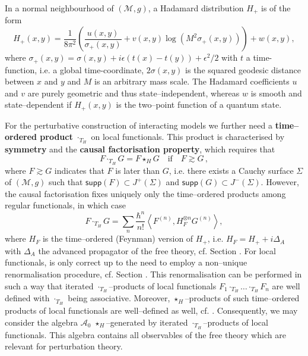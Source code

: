 \documentclass[10pt]{book}
\newcommand{\supp}{\mathsf{supp}}
\newcommand{\Acal}{\mathcal{A}}
\newcommand{\Mcal}{\mathcal{M}}
\theoremstyle{break}
\begin{document}
In a normal neighbourhood of $(\Mcal,g)$, a Hadamard distribution $H_+$ is of the form
\begin{equation}
H_+(x,y)=\frac{1}{8\pi^2}\left(\frac{u(x,y)}{\sigma_+(x,y)}+v(x,y)\log(M^2 \sigma_+(x,y))\right)+w(x,y),
\end{equation}
where $\sigma_+(x,y)=\sigma(x,y)+i\epsilon (t(x)-t(y))+\epsilon^2/2$ with $t$ a time-function, i.e. a global time-coordinate, $2\sigma(x,y)$ is the squared geodesic distance between $x$ and $y$ and $M$ is an arbitrary mass scale. The Hadamard coefficients $u$ and $v$ are purely geometric and thus state--independent, whereas $w$ is smooth and state--dependent if $H_+(x,y)$ is the two--point function of a quantum state.

For the perturbative construction of interacting models we further need a {\bf time--ordered product} $\cdot_{T_H}$ on local functionals. This product is characterised by {\bf symmetry} and the {\bf causal factorisation property}, which requires that 
\begin{equation}
F\cdot_{T_H} G =  F\star_H G\quad    \text{if}\quad F\gtrsim G\,,
\end{equation}
where $F \gtrsim G$ indicates that $F$ is later than $G$, i.e. there exists a Cauchy surface $\Sigma$ of $(\Mcal,g)$ such that $\supp(F) \subset J^+(\Sigma)$ and $\supp(G) \subset J^-(\Sigma)$. However, the causal factorisation fixes uniquely only the time--ordered products among regular functionals, in which case
\begin{equation}
F \cdot_{T_H}  G =  \sum_n \frac{\hbar^n}{n!}\left\langle F^{(n)}, H_F^{\otimes n} G^{(n)} \right\rangle,
\end{equation}
where $H_F$ is the time--ordered (Feynman) version of $H_+$, i.e. $H_F=H_++i\Delta_A$ with $\Delta_A$ the advanced propagator of the free theory, cf. Section %
. For local functionals, %
is only correct up to the need to employ a non--unique renormalisation procedure, cf. Section %
. This renormalisation can be performed in such a way that iterated $\cdot_{T_H}$--products of local functionals $F_1 \cdot_{T_H} \dots \cdot_{T_H} F_n$ are well defined with $\cdot_{T_H}$ being associative. Moreover, $\star_H$--products of such time--ordered products of local functionals are well--defined as well, cf. %
. Consequently, we may consider the algebra $\Acal_0$ $\star_H$--generated by iterated $\cdot_{T_H}$--products of local functionals. This algebra contains all observables of the free theory which are relevant for perturbation theory.
\end{document}
